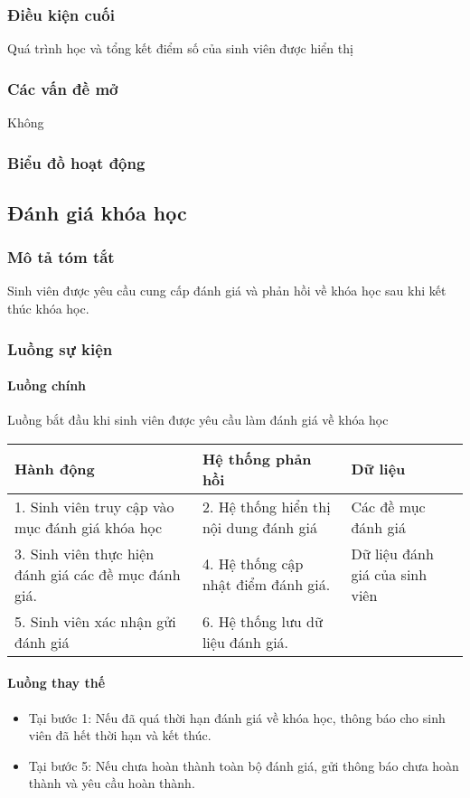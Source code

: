 \documentclass[./../main_file.tex]{subfiles}
\begin{document}
\subsubsection{Điều kiện cuối}
Quá trình học và tổng kết điểm số của sinh viên được hiển thị

\subsubsection{Các vấn đề mở}
Không

\subsubsection{Biểu đồ hoạt động}

\subsection{Đánh giá khóa học}
\subsubsection{Mô tả tóm tắt}
Sinh viên được yêu cầu cung cấp đánh giá và phản hồi về khóa học sau khi kết thúc khóa học.

\subsubsection{Luồng sự kiện}
\paragraph{Luồng chính}
Luồng bắt đầu khi sinh viên được yêu cầu làm đánh giá về khóa học
\begin{longtable}{|p{}|p{}|p{}|}
		\hline
		\textbf{Hành động}              & \textbf{Hệ thống phản hồi}     & \textbf{Dữ liệu} \\ \hline
		1. Sinh viên truy cập vào mục đánh giá khóa học       & 2. Hệ thống hiển thị nội dung đánh giá & Các đề mục đánh giá            \\ \hline
		3. Sinh viên thực hiện đánh giá các đề mục đánh giá. & 4. Hệ thống cập nhật điểm đánh giá.    & Dữ liệu đánh giá của sinh viên \\ \hline
		5. Sinh viên xác nhận gửi đánh giá & 6. Hệ thống lưu dữ liệu đánh giá. &                  \\ \hline
\end{longtable}
\paragraph{Luồng thay thế}
\begin{itemize}
	\item Tại bước 1: Nếu đã quá thời hạn đánh giá về khóa học, thông báo cho sinh viên đã hết thời hạn và kết thúc.
	\item Tại bước 5: Nếu chưa hoàn thành toàn bộ đánh giá, gửi thông báo chưa hoàn thành và yêu cầu hoàn thành.
	
\end{itemize}
\end{document}
